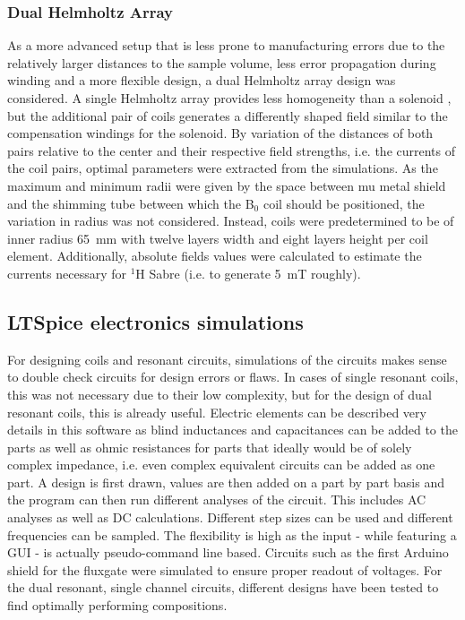         \subsubsection{Dual Helmholtz Array}\label{simulations:DualHelmholtzArray}
        As a more advanced setup that is less prone to manufacturing errors due to the relatively larger distances to the sample volume, less error propagation during winding and a more flexible design, a dual Helmholtz array design was considered. A single Helmholtz array provides less homogeneity than a solenoid \cite{bienkowski_techniczne_2015}, but the additional pair of coils generates a differently shaped field similar to the compensation windings for the solenoid. By variation of the distances of both pairs relative to the center and their respective field strengths, i.e. the currents of the coil pairs, optimal parameters were extracted from the simulations. As the maximum and minimum radii were given by the space between mu metal shield and the shimming tube between which the B$_0$ coil should be positioned, the variation in radius was not considered. Instead, coils were predetermined to be of inner radius \SI{65}{\mm} with twelve layers width and eight layers height per coil element.
        Additionally, absolute fields values were calculated to estimate the currents necessary for $^{1}$H Sabre (i.e. to generate \SI{5}{\milli\tesla} roughly).
    \subsection{LTSpice electronics simulations}
        For designing coils and resonant circuits, simulations of the circuits makes sense to double check circuits for design errors or flaws. In cases of single resonant coils, this was not necessary due to their low complexity, but for the design of dual resonant coils, this is already useful. Electric elements can be described very details in this software as blind inductances and capacitances can be added to the parts as well as ohmic resistances for parts that ideally would be of solely complex impedance, i.e. even complex equivalent circuits can be added as one part.
        A design is first drawn, values are then added on a part by part basis and the program can then run different analyses of the circuit. This includes AC analyses as well as DC calculations. Different step sizes can be used and different frequencies can be sampled. The flexibility is high as the input - while featuring a GUI - is actually pseudo-command line based. Circuits such as the first Arduino shield for the fluxgate were simulated to ensure proper readout of voltages. For the dual resonant, single channel circuits, different designs have been tested to find optimally performing compositions.

